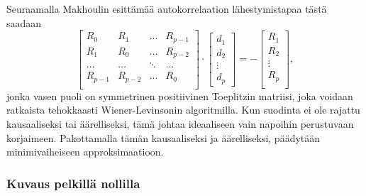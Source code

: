\documentclass[finnish,12pt]{article}
\begin{document}
Seuraamalla Makhoulin esittämää \cite{Makhoul1975} autokorrelaation lähestymistapaa tästä saadaan \begin{equation}
\begin{bmatrix}
R_0 & R_1 & \hdots & R_{p-1} \\
R_1 & R_0 & \hdots & R_{p-2} \\
\hdots & \hdots & \ddots & \hdots \\
R_{p-1} & R_{p-2} & \hdots & R_0 \\
\end{bmatrix} \cdot \begin{bmatrix}
d_1 \\
d_2 \\
\vdots \\
d_p
\end{bmatrix} = - \begin{bmatrix}
R_1 \\
R_2 \\
\vdots \\
R_p \\
\end{bmatrix},
\end{equation} jonka vasen puoli on symmetrinen positiivinen Toeplitzin matriisi, joka voidaan ratkaista tehokkaasti Wiener-Levinsonin algoritmilla. Kun suodinta ei ole rajattu kausaaliseksi tai äärelliseksi, tämä johtaa ideaaliseen vain napoihin perustuvaan korjaimeen. Pakottamalla tämän kausaaliseksi ja äärelliseksi, päädytään minimivaiheiseen approksimaatioon.
\cite{Mourjopoulos1991}

\subsubsection{Kuvaus pelkillä nollilla}
\end{document}
